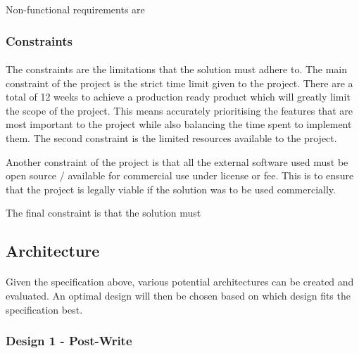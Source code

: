 \documentclass[12pt, conference, final, a4paper, onecolumn, compsoc]{IEEEtran}
\begin{document}
Non-functional requirements are

\subsubsection*{Constraints}
\paragraph{}

The constraints are the limitations that the solution must adhere to. The main
constraint of the project is the strict time limit given to the project. There
are a total of 12 weeks to achieve a production ready product which will greatly
limit the scope of the project. This means accurately prioritising the features
that are most important to the project while also balancing the time spent to
implement them. The second constraint is the limited resources available to the
project.


Another constraint of the project is that all the external software used must be
open source / available for commercial use under license or fee. This is to
ensure that the project is legally viable if the solution was to be used
commercially.


The final constraint is that the solution must



\subsection*{Architecture}

    \paragraph{}
    Given the specification above, various potential architectures can be
    created and evaluated. An optimal design will then be chosen based on which
    design fits the specification best.


    \subsubsection*{Design 1 - Post-Write}
    \paragraph{}
\end{document}
